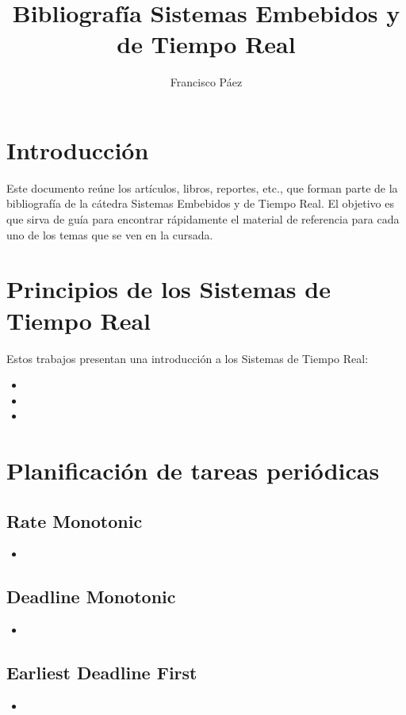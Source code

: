 \documentclass{article}
\title{Bibliografía Sistemas Embebidos y de Tiempo Real}
\author{Francisco Páez}
\begin{document}
\maketitle

\section{Introducción}
Este documento reúne los artículos, libros, reportes, etc., que forman parte de la bibliografía de la cátedra Sistemas Embebidos y de Tiempo Real. El objetivo es que sirva de guía para encontrar rápidamente el material de referencia para cada uno de los temas que se ven en la cursada.

\section{Principios de los Sistemas de Tiempo Real}
Estos trabajos presentan una introducción a los Sistemas de Tiempo Real:
\begin{itemize}
    \item {}
    \item {}
    \item {}
\end{itemize}

\section{Planificación de tareas periódicas}
\subsection*{Rate Monotonic}
\begin{itemize}
    \item {}
\end{itemize}

\subsection*{Deadline Monotonic}
\begin{itemize}
    \item {}
\end{itemize}

\subsection*{Earliest Deadline First}
\begin{itemize}
    \item {}
\end{itemize}
\end{document}
